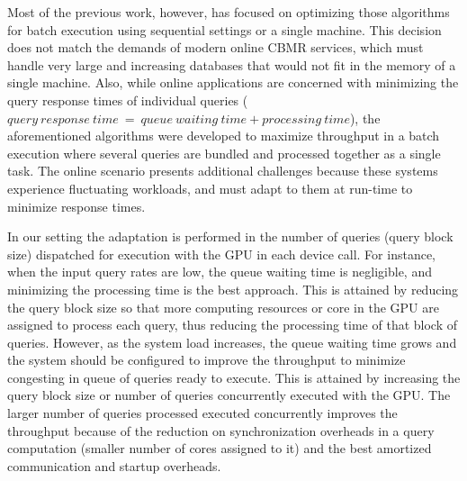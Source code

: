Most of the previous work, however, has focused on optimizing those algorithms for batch execution using sequential settings or a single machine. This decision does not match the demands of modern online CBMR services, which must handle very large and increasing databases that would not fit in the memory of a single machine. Also, while online applications are concerned with minimizing the query response times of individual queries ($query\ response\ time\ =\ queue\ waiting\ time + processing\ time$), the aforementioned algorithms were developed to maximize throughput in a batch execution where several queries are bundled and processed together as a single task. The online scenario presents additional challenges because these systems experience fluctuating workloads, and must adapt to them at run-time to minimize response times. 

In our setting the adaptation is performed in the number of queries (query block size) dispatched for execution with the GPU in each device call. For instance, when the input query rates are low, the queue waiting
time is negligible, and minimizing the processing time is the best approach. This is attained by reducing the query block size
so that more computing resources or core in the GPU are assigned to process each query, thus reducing the processing time of that block of queries. However, as the system load increases, the queue waiting time grows and the system should be configured to improve
the throughput to minimize congesting in queue of queries ready to execute. This is attained by increasing the query block size or number of queries concurrently executed with the GPU. The larger number of queries processed executed concurrently 
improves the throughput because of the reduction on synchronization overheads in a query computation (smaller number of
cores assigned to it) and the best amortized communication and startup overheads.



